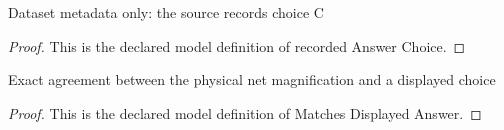 \begin{definition}
  \label{def:physics:phyx-mini-0134:phyxminiproblems-problemphyxmini0134-recordedanswerchoice}
  Dataset metadata only: the source records choice C
\end{definition}
\begin{proof}
  This is the declared model definition of recorded Answer Choice.
\end{proof}
\begin{definition}
  \label{def:physics:phyx-mini-0134:phyxminiproblems-problemphyxmini0134-matchesdisplayedanswer}
  Exact agreement between the physical net magnification and a displayed choice
\end{definition}
\begin{proof}
  This is the declared model definition of Matches Displayed Answer.
\end{proof}
